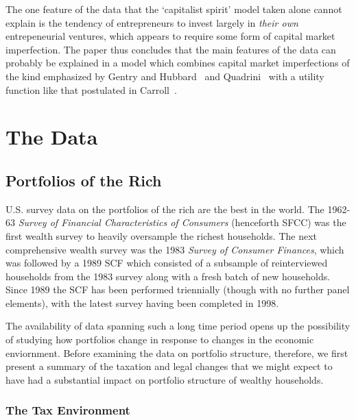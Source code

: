 \documentclass[12pt]{article}
\begin{document}
The one feature of the data that the `capitalist spirit' model taken alone
cannot explain is the tendency of entrepreneurs to invest largely in \textit{%
their own} entrepeneurial ventures, which appears to require some form of
capital market imperfection. The paper thus concludes that the main features
of the data can probably be explained in a model which combines capital
market imperfections of the kind emphasized by Gentry and Hubbard~\cite
{gentry&hubbard:wealthysave} and Quadrini~\cite{quadrini:entrepreneurship}
with a utility function like that postulated in Carroll~\cite
{carroll:richsave}.

\section{The Data}

\subsection{Portfolios of the Rich}

U.S. survey data on the portfolios of the rich are the best in the world.
The 1962-63 \textit{Survey of Financial Characteristics of Consumers}
(henceforth SFCC) was the first wealth survey to heavily oversample the
richest households. The next comprehensive wealth survey was the 1983 
\textit{Survey of Consumer Finances}, which was followed by a 1989 SCF which
consisted of a subsample of reinterviewed households from the 1983 survey
along with a fresh batch of new households. Since 1989 the SCF has been
performed triennially (though with no further panel elements), with the
latest survey having been completed in 1998.

The availability of data spanning such a long time period opens up the
possibility of studying how portfolios change in response to changes in the
economic enviornment. Before examining the data on portfolio structure,
therefore, we first present a summary of the taxation and legal changes that
we might expect to have had a substantial impact on portfolio structure of
wealthy households.

\subsubsection{The Tax Environment}
\end{document}
